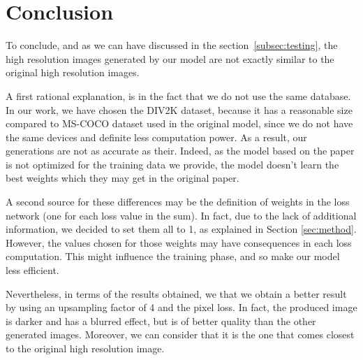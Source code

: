 \documentclass{article}
\begin{document}
{
    \section{Conclusion}
    \label{sec:conclusion}

    To conclude, and as we can have discussed in the section~\ref{subsec:testing}, the high resolution images generated by our model are not exactly similar to the original high resolution images.

    \bigskip

    A first rational explanation, is in the fact that we do not use the same database. In our work, we have chosen the DIV2K dataset, because it has a reasonable size compared to MS-COCO dataset used in the original model, since we do not have the same devices and definite less computation power. As a result, our generations are not as accurate as their. Indeed, as the model based on the paper is not optimized for the training data we provide, the model doesn't learn the best weights which they may get in the original paper.

    A second source for these differences may be the definition of weights in the loss network (one for each loss value in the sum). In fact, due to the lack of additional information, we decided to set them all to 1, as explained in Section \ref{sec:method}. However, the values chosen for those weights may have consequences in each loss computation. This might influence the training phase, and so make our model less efficient.

    \bigskip

    Nevertheless, in terms of the results obtained, we that we obtain a better result by using an upsampling factor of 4 and the pixel loss. In fact, the produced image is darker and has a blurred effect, but is of better quality than the other generated images. Moreover, we can consider that it is the one that comes closest to the original high resolution image.
}
\end{document}
